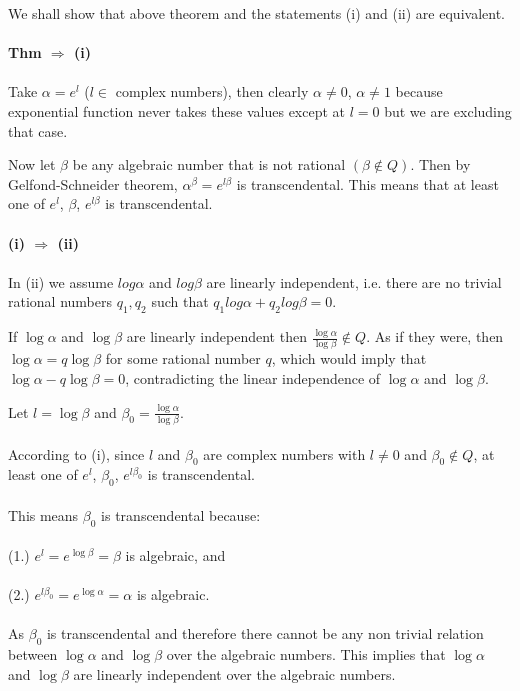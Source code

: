 \documentclass{article}
\begin{document}
We shall show that above theorem and the statements (i) and (ii) are equivalent.\\\\

\textbf{ Thm $\Rightarrow$ (i) }\\\\
Take $\alpha = e^{l}$ ($ l \in$ complex numbers), then clearly $\alpha \neq 0$,
$\alpha \neq 1$ because exponential function never takes these values except 
at $l = 0$ but we are excluding that case. 

Now let $\beta$ be any algebraic number that is not rational $(\beta \not\in Q)$.
Then by Gelfond-Schneider theorem, $\alpha^{\beta} = e^{l\beta}$ is transcendental. This means 
that at least one of $e^{l}$, $\beta$, $e^{l\beta}$ is transcendental.\\\\

\textbf{ (i) $\Rightarrow$ (ii) }\\\\
In (ii) we  assume $log \alpha$ and $log \beta$ are linearly  independent, i.e. 
there are no trivial rational numbers $q_1, q_2$ such that $q_1log \alpha + q_2log \beta = 0$.

If $\log \alpha$ and $\log \beta$ are linearly independent then $\frac{\log \alpha}{\log \beta} \not\in Q$.
As if they were, then $\log \alpha = q\log \beta$ for some rational number $q$, which would imply that
$\log \alpha - q\log \beta = 0$, contradicting the linear independence of $\log \alpha$ and $\log \beta$.

Let $l = \log \beta$ and $\beta_0 = \frac{\log \alpha}{\log \beta}$. \\\\
According to (i), since $l$ and $\beta_0$ are complex numbers with $l \neq 0$ and $\beta_0 \not\in Q$, at least one of $e^{l}$, $\beta_0$, $e^{l\beta_0}$ is transcendental.\\\\
This means $\beta_0$ is transcendental because: \\\\
(1.) $e^l = e^{\log \beta} = \beta$ is algebraic, and \\\\
(2.) $e^{l\beta_0} = e^{\log \alpha} = \alpha$ is algebraic.\\\\

As $\beta_0$ is transcendental and therefore there cannot be any non trivial relation 
between $\log \alpha$ and $\log \beta$ over the algebraic numbers. This implies that
$\log \alpha$ and $\log \beta$ are linearly independent over the algebraic numbers.\\\\
\end{document}
